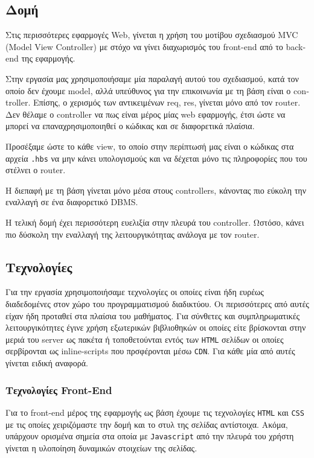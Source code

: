 \documentclass[nonacm, language=english, language=greek]{acmart}
\newcommand{\en}[1]{\textlatin{#1}}
\newcommand{\src}[1]{\texttt{\en{#1}}}
\begin{document}
\subsection{Δομή} 

Στις περισσότερες εφαρμογές \en{Web}, 
γίνεται η χρήση του μοτίβου σχεδιασμού \en{MVC (Model View Controller)}
με στόχο να γίνει διαχωρισμός του \en{front-end} από το \en{back-end} 
της εφαρμογής. 

Στην εργασία μας χρησιμοποιήσαμε μία παραλαγή αυτού του σχεδιασμού, 
κατά τον οποίο δεν έχουμε 
\en{model}, αλλά υπεύθυνος για την επικοινωνία με τη βάση είναι 
ο \en{controller}. 
Επίσης, ο χερισμός των αντικειμένων
\en{req, res}, γίνεται μόνο από τον 
\en{router}. Δεν θέλαμε ο \en{controller} να  πως 
είναι μέρος μίας \en{web} εφαρμογής, έτσι ώστε να 
μπορεί να επαναχρησιμοποιηθεί ο κώδικας και σε διαφορετικά πλαίσια.

Προσέξαμε ώστε το κάθε \en{view}, το οποίο στην περίπτωσή 
μας είναι ο κώδικας στα αρχεία \src{.hbs} να μην κάνει 
υπολογισμούς και να δέχεται μόνο τις πληροφορίες που του στέλνει ο \en{router}.

Η διεπαφή με τη βάση γίνεται μόνο μέσα στους \en{controllers}, 
κάνοντας πιο εύκολη την εναλλαγή σε ένα διαφορετικό \en{DBMS}.

Η τελική δομή έχει περισσότερη ευελιξία στην πλευρά του \en{controller}.
Ωστόσο, κάνει πιο δύσκολη την εναλλαγή της λειτουργικότητας 
ανάλογα με τον \en{router}.

\subsection{Τεχνολογίες}

Για την εργασία χρησιμοποιήσαμε τεχνολογίες οι οποίες 
είναι ήδη ευρέως διαδεδομένες στον χώρο του προγραμματισμού 
διαδικτύου. Οι περισσότερες από αυτές είχαν ήδη προταθεί 
στα πλαίσια του μαθήματος.
Για σύνθετες και συμπληρωματικές λειτουργικότητες έγινε 
χρήση εξωτερικών βιβλιοθηκών οι οποίες 
είτε βρίσκονται στην μεριά του \en{server} ως 
πακέτα ή τοποθετούνται εντός των \src{HTML} σελίδων 
οι οποίες σερβίρονται ως \en{inline-scripts} που πρσφέρονται 
μέσω \src{CDN}. \cite{CDN} Για κάθε μία από αυτές γίνεται ειδική αναφορά.

\subsubsection{Τεχνολογίες \en{Front-End}}

Για το \en{front-end} μέρος της εφαρμογής ως βάση έχουμε τις τεχνολογίες
\src{HTML} και \src{CSS} με τις οποίες χειριζόμαστε την δομή και το στυλ της
σελίδας αντίστοιχα. Ακόμα, υπάρχουν ορισμένα σημεία στα οποία με
\src{Javascript} από την πλευρά του χρήστη γίνεται η υλοποίηση δυναμικών
στοιχείων της σελίδας. 
\end{document}
